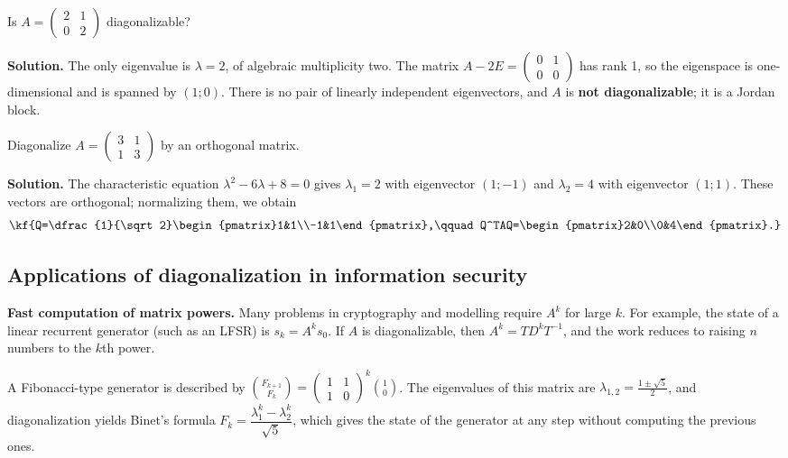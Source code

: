 \begin{misol}
Is $A=\begin{pmatrix}2&1\\0&2\end{pmatrix}$ diagonalizable?

\textbf{Solution.} The only eigenvalue is $\lambda=2$, of algebraic
multiplicity two. The matrix $A-2E=\begin{pmatrix}0&1\\0&0\end{pmatrix}$
has rank 1, so the eigenspace is one-dimensional and is spanned by
$(1;0)$. There is no pair of linearly independent eigenvectors, and
$A$ is \textbf{not diagonalizable}; it is a Jordan block.
\end{misol}

\begin{misol}
Diagonalize $A=\begin{pmatrix}3&1\\1&3\end{pmatrix}$ by an orthogonal
matrix.

\textbf{Solution.} The characteristic equation $\lambda^2-6\lambda+8=0$
gives $\lambda_1=2$ with eigenvector $(1;-1)$ and $\lambda_2=4$ with
eigenvector $(1;1)$. These vectors are orthogonal; normalizing them, we
obtain
\[\kf{Q=\dfrac{1}{\sqrt2}\begin{pmatrix}1&1\\-1&1\end{pmatrix},\qquad
Q^TAQ=\begin{pmatrix}2&0\\0&4\end{pmatrix}.}\]
\end{misol}

\subsection{Applications of diagonalization in information security}

\textbf{Fast computation of matrix powers.} Many problems in cryptography
and modelling require $A^k$ for large $k$. For example, the state of a
linear recurrent generator (such as an LFSR) is $s_{k}=A^ks_0$. If $A$ is
diagonalizable, then $A^k=TD^kT^{-1}$, and the work reduces to raising
$n$ numbers to the $k$th power.

\begin{misol}
A Fibonacci-type generator is described by
$\binom{F_{k+1}}{F_k}=\begin{pmatrix}1&1\\1&0\end{pmatrix}^k\binom{1}{0}$.
The eigenvalues of this matrix are $\lambda_{1,2}=\frac{1\pm\sqrt5}{2}$,
and diagonalization yields Binet’s formula
$F_k=\dfrac{\lambda_1^k-\lambda_2^k}{\sqrt5}$, which gives the state of
the generator at any step without computing the previous ones.
\end{misol}

